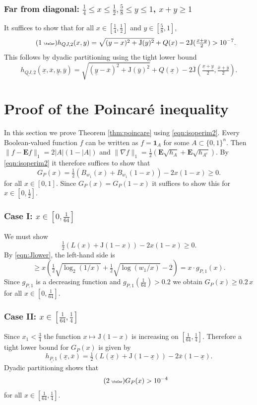 \documentclass[11pt]{amsart}
\theoremstyle{plain}
\newcommand{\auto}{\tag{\addtocounter{equation}{1}\theequation\;{\tiny\faCar}}}
\theoremstyle{definition}
\theoremstyle{remark}
\numberwithin{equation}{section}
\begin{document}
\subsubsection{Far from diagonal: $\tfrac14\leq x\leq \tfrac12, \frac58\leq y\le 1$, $x+y\ge 1$}
\label{sec:QJ-II}
It suffices to show that for all $x\in [\frac14, \frac12]$ and $y\in[\frac58,1]$,
\begin{equation}\label{eqn:h_QJ_2_auto}\auto
h_{QJ,2}(x,y)= \sqrt{(y-x)^2 +{\mathrm{J}}(y)^2}+Q(x)-2{\mathrm{J}}(\tfrac{x+y}{2})>10^{-7}.
\end{equation}
This follows by dyadic partitioning using the tight lower bound
\[ \underline{h_{QJ,2}}(\underline{x},\overline{x},\underline{y},\overline{y}) = \sqrt{(\underline{y}-\overline{x})^2 + {\mathrm{J}}(\overline{y})^2} + Q(\underline{x})-2\overline{{\mathrm{J}}}(\tfrac{\underline{x}+\underline{y}}{2},\tfrac{\overline{x}+\overline{y}}{2}). \]

\section{Proof of the Poincar\'e inequality}\label{sec:poincare}
In this section we prove Theorem \ref{thm:poincare} using \eqref{eqn:isoperim2}.
Every Boolean-valued function $f$ can be written as $f=\mathbf{1}_A$ for some $A\subset \{0,1\}^n$.
Then $\|f-\mathbf{E} f\|_1 = 2|A| (1-|A|)$ and
$\|\nabla f\|_1 = \tfrac{1}{2} ( \mathbf{E} \sqrt{h_A} + \mathbf{E} \sqrt{h_{A^c}})$.
By \eqref{eqn:isoperim2} it therefore suffices to show that
\begin{equation}\label{eqn:poincarepenult}
G_P(x)= \tfrac{1}{2}( B_{w_1}(x) + B_{w_1}(1-x)) - 2x(1-x) \ge 0.
\end{equation}
for all $x\in [0,1]$.
Since $G_P(x)=G_P(1-x)$ it suffices to show this for $x\in [0,\tfrac12]$.

\subsubsection*{Case I: $x\in [0,\tfrac1{64}]$}
We must show
\[\tfrac{1}{2}( L (x) + {\mathrm{J}}(1-x)) - 2x (1-x) \ge 0.\]
By \eqref{eqn:Jlower}, the left-hand side is
\[ \ge x (\tfrac{1}{2} \sqrt{\log_2(1/x)} + \tfrac{1}{2} \sqrt{\log(w_1/x)}- 2) = x\cdot g_{P,1}(x). \]
Since $g_{P,1}$ is a decreasing function and
$g_{P,1}(\tfrac1{64})>0.2$
we obtain $G_{P}(x)\ge 0.2\, x$ for all $x\in [0,\tfrac1{64}]$.

\subsubsection*{Case II: $x\in [\tfrac1{64},\tfrac14]$}
Since $x_1<\tfrac34$ the function $x\mapsto {\mathrm{J}}(1-x)$ is increasing on $[\frac1{64},\frac14]$.
Therefore a tight lower bound for $G_{P}(x)$ is given by
\[\underline{h_{P,1}}(\underline{x},\overline{x})= \tfrac{1}{2}(L(\underline{x}) + {\mathrm{J}}(1-\underline{x})) - 2\overline{x}(1-\underline{x}).\]
Dyadic partitioning shows that
\begin{equation}\label{eqn:h_P_1_auto}\auto
G_{P}(x)>10^{-4}
\end{equation}
for all $x\in [\frac1{64},\frac14]$.
\end{document}
